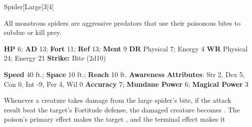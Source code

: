   \begin{monsection}{Spider}[Large]{3}[4]
    \vspace{-1em}\vspace{-1em}
    \vspace{0em}

    
    All monstrous spiders are aggressive predators that use their poisonous bites to subdue or kill prey.
  

    \begin{spellcontent}
      \begin{spelltargetinginfo}
        \pari \textbf{HP} 6;
          \textbf{AD} 13;
          \textbf{Fort} 11;
          \textbf{Ref} 13;
          \textbf{Ment} 9
        \pari \textbf{DR} Physical 7; Energy 4
        \pari \textbf{WR} Physical 24; Energy 21
        \pari \textbf{Strike:}
            Bite  (2d10)
      \end{spelltargetinginfo}
    \end{spellcontent}
    \begin{monsterfooter}
      \pari \textbf{Speed} 40 ft.;
        \textbf{Space} 10 ft.;
        \textbf{Reach} 10 ft.
      \pari \textbf{Awareness} 
      \pari \textbf{Attributes}:
        Str 2, Dex 5,
        Con 0, Int -9,
        Per 4, Wil 0
      \pari \textbf{Accuracy} 7;
        \textbf{Mundane Power} 6;
      \textbf{Magical Power} 3
    \end{monsterfooter}
  \end{monsection}
    Whenever a creature takes damage from the large spider's bite,
      if the attack result beat the target's Fortitude defense,
      the damaged creature becomes .
    The poison's primary effect makes the target , and the terminal effect makes it 
  
